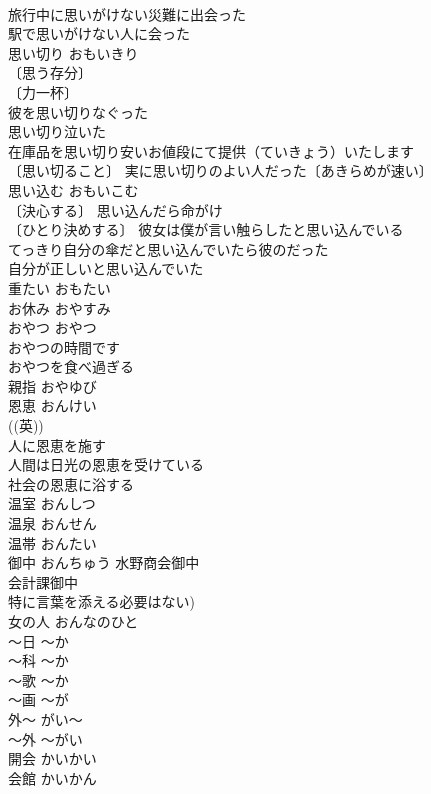 \documentclass[8pt]{extreport}
\begin{document}
\begin{CJK}{UTF8}{min}
\\	旅行中に思いがけない災難に出会った 
\\	駅で思いがけない人に会った 
\\	思い切り	おもいきり	
\\	〔思う存分〕
\\	〔力一杯〕
\\	彼を思い切りなぐった 
\\	思い切り泣いた 
\\	在庫品を思い切り安いお値段にて提供（ていきょう）いたします 
\\	〔思い切ること〕 実に思い切りのよい人だった〔あきらめが速い〕 
\\	思い込む	おもいこむ	
\\	〔決心する〕 思い込んだら命がけ 
\\	〔ひとり決めする〕 彼女は僕が言い触らしたと思い込んでいる 
\\	てっきり自分の傘だと思い込んでいたら彼のだった 
\\	自分が正しいと思い込んでいた 
\\	重たい	おもたい	
\\	お休み	おやすみ	
\\	おやつ	おやつ	
\\	おやつの時間です 
\\	おやつを食べ過ぎる 
\\	親指	おやゆび	
\\	恩恵	おんけい	
\\	((英)) 
\\	人に恩恵を施す 
\\	人間は日光の恩恵を受けている 
\\	社会の恩恵に浴する 
\\	温室	おんしつ	
\\	温泉	おんせん	
\\	温帯	おんたい	
\\	御中	おんちゅう	水野商会御中 
\\	会計課御中 
\\	特に言葉を添える必要はない)
\\	女の人	おんなのひと	
\\	～日	～か	
\\	～科	～か	
\\	～歌	～か	
\\	～画	～が	
\\	外～	がい～	
\\	～外	～がい	
\\	開会	かいかい	
\\	会館	かいかん	

\end{CJK}
\end{document}
